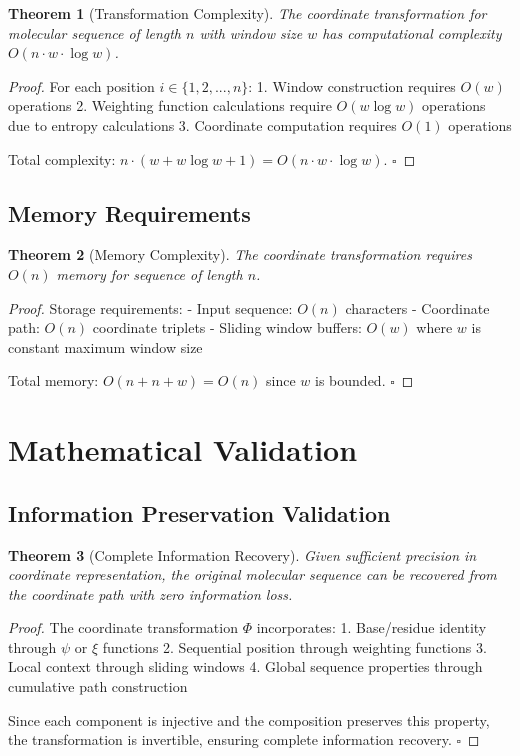 \documentclass[12pt,a4paper]{article}
\newtheorem{theorem}{Theorem}
\begin{document}
\begin{theorem}[Transformation Complexity]
The coordinate transformation for molecular sequence of length $n$ with window size $w$ has computational complexity $O(n \cdot w \cdot \log w)$.
\end{theorem}

\begin{proof}
For each position $i \in \{1,2,...,n\}$:
1. Window construction requires $O(w)$ operations
2. Weighting function calculations require $O(w \log w)$ operations due to entropy calculations
3. Coordinate computation requires $O(1)$ operations

Total complexity: $n \cdot (w + w \log w + 1) = O(n \cdot w \cdot \log w)$. $\square$
\end{proof}

\subsection{Memory Requirements}

\begin{theorem}[Memory Complexity]
The coordinate transformation requires $O(n)$ memory for sequence of length $n$.
\end{theorem}

\begin{proof}
Storage requirements:
- Input sequence: $O(n)$ characters
- Coordinate path: $O(n)$ coordinate triplets
- Sliding window buffers: $O(w)$ where $w$ is constant maximum window size

Total memory: $O(n + n + w) = O(n)$ since $w$ is bounded. $\square$
\end{proof}

\section{Mathematical Validation}

\subsection{Information Preservation Validation}

\begin{theorem}[Complete Information Recovery]
Given sufficient precision in coordinate representation, the original molecular sequence can be recovered from the coordinate path with zero information loss.
\end{theorem}

\begin{proof}
The coordinate transformation $\Phi$ incorporates:
1. Base/residue identity through $\psi$ or $\xi$ functions
2. Sequential position through weighting functions
3. Local context through sliding windows
4. Global sequence properties through cumulative path construction

Since each component is injective and the composition preserves this property, the transformation is invertible, ensuring complete information recovery. $\square$
\end{proof}
\end{document}
